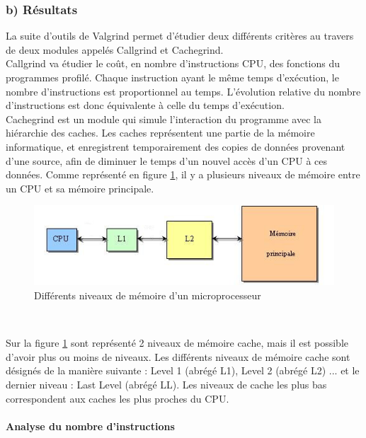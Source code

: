 \documentclass[10pt]{report}
\begin{document}
		\subsubsection{b) Résultats}
		La suite d'outils de Valgrind permet d'étudier deux différents critères au travers de deux modules appelés Callgrind et Cachegrind.\\
		Callgrind va étudier le coût, en nombre d'instructions CPU, des fonctions du programmes profilé. Chaque instruction ayant le même temps d'exécution, le nombre d'instructions est proportionnel au temps. L'évolution relative du nombre d'instructions est donc équivalente à celle du temps d'exécution.\\
		Cachegrind est un module qui simule l'interaction du programme avec la hiérarchie des caches. Les caches représentent une partie de la mémoire informatique, et enregistrent temporairement des copies de données provenant d'une source, afin de diminuer le temps d'un nouvel accès d'un CPU à ces données. Comme représenté en figure \ref{Différents niveaux de mémoire d'un microprocesseur}, il y a plusieurs niveaux de mémoire entre un CPU et sa mémoire principale. 

		\begin{figure}[h!]
			\begin{center}
				\includegraphics[width=13cm]{Reports/figures/Mem_hierarchy.jpg}
			\end{center}	
			\caption{Différents niveaux de mémoire d'un microprocesseur}
			\label{Différents niveaux de mémoire d'un microprocesseur}
		\end{figure}~\par
		Sur la figure \ref{Différents niveaux de mémoire d'un microprocesseur} sont représenté 2 niveaux de mémoire cache, mais il est possible d'avoir plus ou moins de niveaux.
		Les différents niveaux de mémoire cache sont désignés de la manière suivante : Level 1 (abrégé L1), Level 2 (abrégé L2) ... et le dernier niveau : Last Level (abrégé LL). Les niveaux de cache les plus bas correspondent aux caches les plus proches du CPU. 
		
		\paragraph{Analyse du nombre d'instructions}
\end{document}
